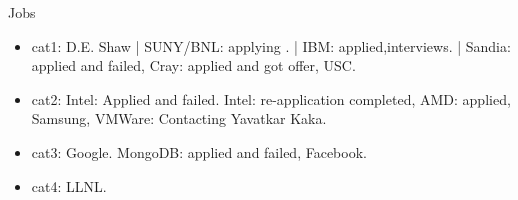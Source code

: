 \documentclass[serif, mathserif, final]{beamer}
\begin{document}
\begin{frame}[label=socialInt] %
  \begin{block}{Jobs}
    \begin{itemize}
      \tiny \item \tiny cat1: D.E. Shaw | SUNY/BNL: applying . | IBM: applied,interviews.  | Sandia:
      applied and failed, Cray: applied and got offer, USC. 
    \item \tiny cat2: Intel: Applied and failed. Intel: re-application
      completed, AMD: applied, Samsung, VMWare: Contacting Yavatkar Kaka. 
    \item \tiny cat3: Google. MongoDB: applied and failed, Facebook. 
    \item \tiny cat4: LLNL. 
    \end{itemize} 
  \end{block} 



\end{frame}
\end{document}
